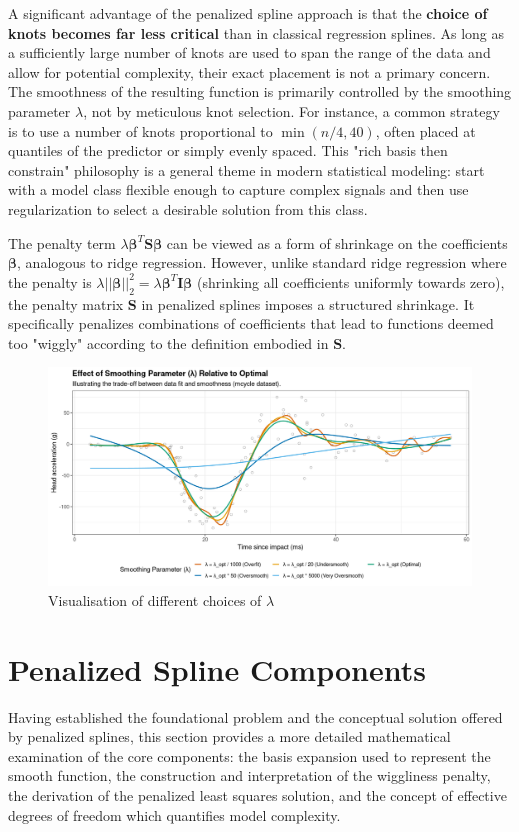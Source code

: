 \documentclass[11pt, a4paper]{article}
\begin{document}
A significant advantage of the penalized spline approach is that the \textbf{choice of knots becomes far less critical} than in classical regression splines. As long as a sufficiently large number of knots are used to span the range of the data and allow for potential complexity, their exact placement is not a primary concern. The smoothness of the resulting function is primarily controlled by the smoothing parameter $\lambda$, not by meticulous knot selection. For instance, a common strategy is to use a number of knots proportional to $\min(n/4, 40)$, often placed at quantiles of the predictor or simply evenly spaced. This "rich basis then constrain" philosophy is a general theme in modern statistical modeling: start with a model class flexible enough to capture complex signals and then use regularization to select a desirable solution from this class.

The penalty term $\lambda \boldsymbol{\beta}^T \mathbf{S} \boldsymbol{\beta}$ can be viewed as a form of shrinkage on the coefficients $\boldsymbol{\beta}$, analogous to ridge regression. However, unlike standard ridge regression where the penalty is $\lambda ||\boldsymbol{\beta}||_2^2 = \lambda \boldsymbol{\beta}^T \mathbf{I} \boldsymbol{\beta}$ (shrinking all coefficients uniformly towards zero), the penalty matrix $\mathbf{S}$ in penalized splines imposes a structured shrinkage. It specifically penalizes combinations of coefficients that lead to functions deemed too "wiggly" according to the definition embodied in $\mathbf{S}$.

\begin{figure}[h!]
 \centering
 \includegraphics[width=\linewidth]{optimal_over_under.png}
 \caption{Visualisation of different choices of $\lambda$}
 \label{fig:enter-label-4}
\end{figure}

\newpage
\section{ Penalized Spline Components}
Having established the foundational problem and the conceptual solution offered by penalized splines, this section provides a more detailed mathematical examination of the core components: the basis expansion used to represent the smooth function, the construction and interpretation of the wiggliness penalty, the derivation of the penalized least squares solution, and the concept of effective degrees of freedom which quantifies model complexity.
\end{document}
